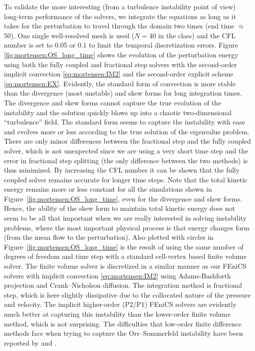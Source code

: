 To validate the more interesting (from a turbulence instability point of
view) long-term performance of the solvers,
we integrate the equations as long as it takes for the perturbation to
travel through the domain two times (end time $\approx$ 50). One single
well-resolved mesh is used ($N = 40$ in the  class) and
the CFL number is set to 0.05 or 0.1 to limit the temporal discretization
errors. Figure \ref{fig:mortensen:OS_long_time} shows the evolution of
the perturbation energy using both the fully coupled and fractional step
solvers with the second-order implicit convection \eqref{eq:mortensen:IM2}
and the second-order explicit scheme \eqref{eq:mortensen:EX}. Evidently,
the standard form of convection is more stable than the divergence (most
unstable) and skew forms for long integration times. The divergence and
skew forms cannot capture the true evolution of the instability and the
solution quickly blows up into a chaotic two-dimensional ``turbulence''
field. The standard form seems to capture the instability with ease and
evolves more or less according to the true solution of the eigenvalue
problem. There are only minor differences between the fractional step
and the fully coupled solver, which is not unexpected since we are
using a very short time step and the error in fractional step splitting
(the only difference between the two methods) is thus minimized. By
increasing the CFL number it can be shown that the fully coupled solver
remains accurate for longer time steps. Note that the total kinetic
energy remains more or less constant for all the simulations shown
in Figure~\ref{fig:mortensen:OS_long_time}, even for the divergence
and skew forms. Hence, the ability of the skew form to maintain total
kinetic energy does not seem to be all that important when we are really
interested in solving instability problems, where the most important
physical process is that energy changes form (from the mean flow to the
perturbation). Also plotted with circles in Figure~\ref{fig:mortensen:OS_long_time}
is the result of using the same number of degrees of freedom
and time step with a standard cell-vertex based finite volume solver.
The finite volume solver is discretized in a similar manner as our
FEniCS solvers with implicit convection \eqref{eq:mortensen:IM2}
using Adams-Bashforth projection and Crank--Nicholson diffusion. The
integration method is fractional step, which is here slightly dissipative
due to the collocated nature of the pressure and velocity. The implicit
higher-order (P2/P1) FEniCS solvers are evidently much better at
capturing this instability than the lower-order finite volume method,
which is not surprising. The difficulties that low-order finite
difference methods face when trying to capture the Orr--Sommerfeld
instability have been reported by \citet{MalikZangHussaini1984} and
\citet{CanutoHussainiQuarteroniEtAl2007}.

